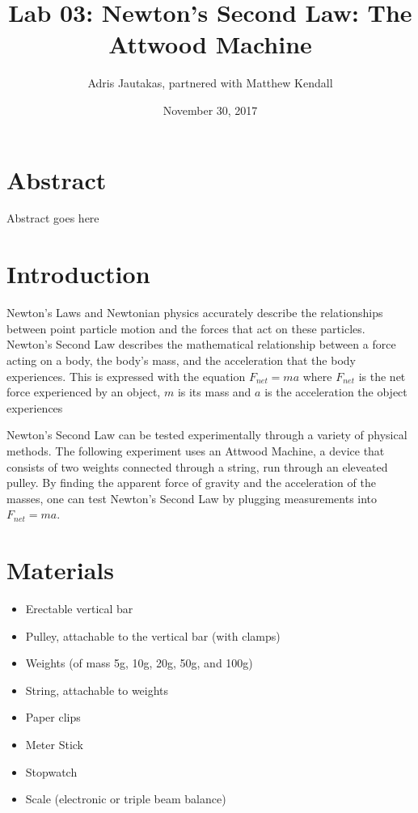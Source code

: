 \documentclass[12pt]{article}
\title{Lab 03: Newton's Second Law: The Attwood Machine}
\author{Adris Jautakas, partnered with Matthew Kendall}
\date{November 30, 2017}
\begin{document}
   \maketitle

    \section*{Abstract}
        {\small 
            Abstract goes here
        }
    \section{Introduction}
        \par Newton's Laws and Newtonian physics accurately describe the 
        relationships between point particle motion and the forces
        that act on these particles.
        Newton's Second Law describes the mathematical relationship 
        between a force acting on a body, the body's mass, and the
        acceleration that the body experiences. This is expressed with
        the equation $F_{net} = ma$ where $F_{net}$ is the net force experienced
        by an object, $m$ is its mass and $a$ is the acceleration the object
        experiences
        \par Newton's Second Law can be tested experimentally through a variety
        of physical methods. The following experiment uses an Attwood Machine,
        a device that consists of two weights connected through a string, run
        through an eleveated pulley. By finding the apparent force of gravity
        and the acceleration of the masses, one can test Newton's Second Law
        by plugging measurements into $F_{net} = ma$.


    \section{Materials}
        \begin{itemize}
            \item Erectable vertical bar
            \item Pulley, attachable to the vertical bar (with clamps)
            \item Weights (of mass 5g, 10g, 20g, 50g, and 100g)
            \item String, attachable to weights
            \item Paper clips
            \item Meter Stick
            \item Stopwatch
            \item Scale (electronic or triple beam balance)
        \end{itemize}
\end{document}
